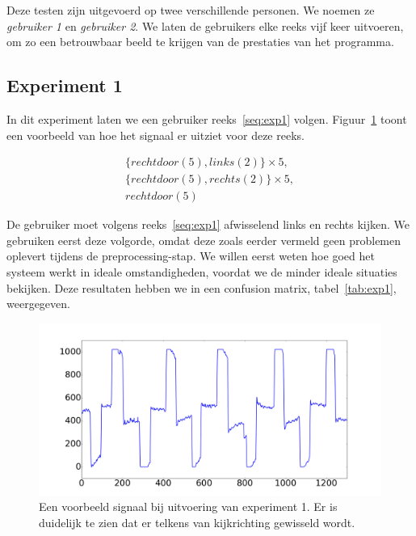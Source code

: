 \documentclass{article}
\begin{document}
Deze testen zijn uitgevoerd op twee verschillende personen. We noemen ze \textit{gebruiker 1} en \textit{gebruiker 2}. We laten de gebruikers elke reeks vijf keer uitvoeren, om zo een betrouwbaar beeld te krijgen van de prestaties van het programma.

\subsection{Experiment 1}

In dit experiment laten we een gebruiker reeks~\ref{seq:exp1} volgen. Figuur~\ref{fig:exp1} toont een voorbeeld van hoe het signaal er uitziet voor deze reeks. 

\begin{equation}
\begin{aligned}
\label{seq:exp1}
& \{rechtdoor(5), links(2)\} \times 5,& \\
& \{rechtdoor(5), rechts(2)\} \times 5,& \\
& rechtdoor(5) &
\end{aligned}
\end{equation}

De gebruiker moet volgens reeks~\ref{seq:exp1} afwisselend links en rechts kijken. We gebruiken eerst deze volgorde, omdat deze zoals eerder vermeld geen problemen oplevert tijdens de preprocessing-stap. We willen eerst weten hoe goed het systeem werkt in ideale omstandigheden, voordat we de minder ideale situaties bekijken. Deze resultaten hebben we in een confusion matrix, tabel~\ref{tab:exp1}, weergegeven.


\begin{figure}[h]
\centering
\includegraphics[width=\linewidth]{images/experiment1}
\caption{Een voorbeeld signaal bij uitvoering van experiment 1. Er is duidelijk te zien dat er telkens van kijkrichting gewisseld wordt.}
\label{fig:exp1}
\end{figure}
\end{document}
